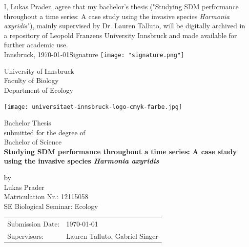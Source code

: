 \documentclass[12pt,a4paper]{article}
\begin{document}
\def\findate{\today}


\thispagestyle{empty}
I, Lukas Prader, agree that my bachelor's thesis ("Studying SDM performance throughout a time series: A case study using the invasive species \textit{Harmonia axyridis}"), mainly supervised by Dr. Lauren Talluto, will be digitally archived in a repository of Leopold Franzens University Innsbruck and made available for further academic use. \\

Innsbruck, \findate					\hfill Signature \texttt{[image: "signature.png"]}

\newpage
\thispagestyle{empty}
\begin{center}
    \Large{University of Innsbruck \\ Faculty of Biology} \\
    \vspace{3mm}
    \large{Department of Ecology}
    \vspace{10mm}

    \texttt{[image: universitaet-innsbruck-logo-cmyk-farbe.jpg]}

    \vspace{10mm}
    \Large{Bachelor Thesis} \\
    \large{submitted for the degree of} \\
    \Large{Bachelor of Science} \\
    \vspace{10mm}
    \LARGE{\textbf{Studying SDM performance throughout a time series: A case study using the invasive species \textit{Harmonia axyridis}}} \\
    \vspace{10mm}

    \large{by \\ Lukas Prader \\ Matriculation Nr.: 12115058 \\ SE Biological Seminar: Ecology}
\end{center}

\vspace{30mm}
\begin{tabular}{ll}
    \large{Submission Date:} & \large{\findate}                       \\
    \large{Supervisors:}     & \large{Lauren Talluto, Gabriel Singer} \\
\end{tabular}
\end{document}
